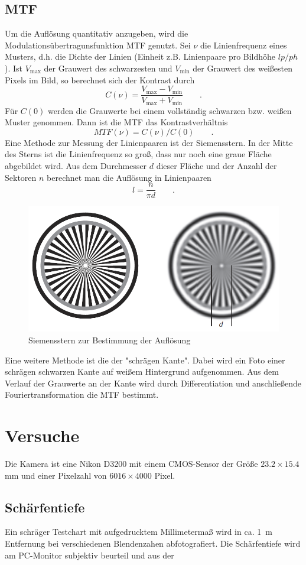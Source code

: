 \subsection{MTF}
Um die Auflösung quantitativ anzugeben, wird die Modulationsübertragunsfunktion MTF genutzt. Sei $\nu$ die Linienfrequenz eines Musters, d.h. die Dichte der Linien (Einheit z.B. Linienpaare pro Bildhöhe $lp/ph$). Ist $V_{\text{max}}$ der Grauwert des schwarzesten und $V_{\text{min}}$ der Grauwert des weißesten Pixels im Bild, so berechnet sich der Kontrast durch
\begin{equation}
	C(\nu)=\frac{V_{\text{max}}-V_{\text{min}}}{V_{\text{max}}+V_{\text{min}}}\qquad .
\label{eq:kontrast}
\end{equation}
Für $C(0)$ werden die Grauwerte bei einem vollständig schwarzen bzw. weißen Muster genommen. Dann ist die MTF das Kontrastverhältnis
\begin{equation}
	MTF(\nu)=C(\nu)/C(0)\qquad .
\label{eq:mtf}
\end{equation}
Eine Methode zur Messung der Linienpaaren ist der Siemensstern. In der Mitte des Sterns ist die Linienfrequenz so groß, dass nur noch eine graue Fläche abgebildet wird. Aus dem Durchmesser $d$ dieser Fläche und der Anzahl der Sektoren $n$ berechnet man die Auflösung in Linienpaaren
\begin{equation}
	l=\frac{n}{\pi d}\qquad .
\label{eq:siemens}
\end{equation}
\begin{figure}[h]
  \centering
  \includegraphics[width=.5\textwidth]{res/siemens}
  \caption{Siemensstern zur Bestimmung der Auflösung}
  \label{fig:siemens}
\end{figure}
Eine weitere Methode ist die der "schrägen Kante". Dabei wird ein Foto einer schrägen schwarzen Kante auf weißem Hintergrund aufgenommen. Aus dem Verlauf der Grauwerte an der Kante wird durch Differentiation und anschließende Fouriertransformation die MTF bestimmt.

\section{Versuche}
Die Kamera ist eine Nikon D3200 mit einem CMOS-Sensor der Größe $23.2 \times 15.4$ mm und einer Pixelzahl von $6016 \times 4000$ Pixel.
\subsection{Schärfentiefe}
Ein schräger Testchart mit aufgedrucktem Millimetermaß wird in ca. \SI{1}{m} Entfernung bei verschiedenen Blendenzahen abfotografiert. Die Schärfentiefe wird am PC-Monitor subjektiv beurteil und aus der 